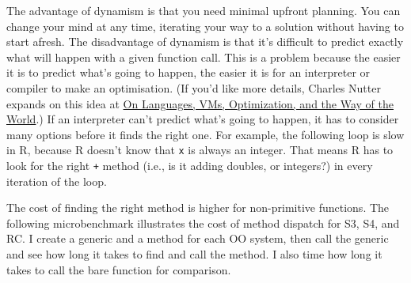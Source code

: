 The advantage of dynamism is that you need minimal upfront planning. You
can change your mind at any time, iterating your way to a solution
without having to start afresh. The disadvantage of dynamism is that
it's difficult to predict exactly what will happen with a given function
call. This is a problem because the easier it is to predict what's going
to happen, the easier it is for an interpreter or compiler to make an
optimisation. (If you'd like more details, Charles Nutter expands on
this idea at
\href{http://blog.headius.com/2013/05/on-languages-vms-optimization-and-way.html}{On
Languages, VMs, Optimization, and the Way of the World}.) If an
interpreter can't predict what's going to happen, it has to consider
many options before it finds the right one. For example, the following
loop is slow in R, because R doesn't know that \texttt{x} is always an
integer. That means R has to look for the right \texttt{+} method (i.e.,
is it adding doubles, or integers?) in every iteration of the loop.

\begin{Shaded}
\begin{Highlighting}[]
\StringTok{ }
\NormalTok{:}\NormalTok{) \{}
  \StringTok{ }\StringTok{ }
\NormalTok{\}}
\end{Highlighting}
\end{Shaded}

The cost of finding the right method is higher for non-primitive
functions. The following microbenchmark illustrates the cost of method
dispatch for S3, S4, and RC. I create a generic and a method for each OO
system, then call the generic and see how long it takes to find and call
the method. I also time how long it takes to call the bare function for
comparison. 

\begin{Shaded}
\begin{Highlighting}[]
\StringTok{ }

\StringTok{ }\NormalTok{(}\NormalTok{)}
\StringTok{ }

\StringTok{ }\NormalTok{(}\NormalTok{, }\NormalTok{(} \NormalTok{))}
\NormalTok{(}\NormalTok{(}\NormalTok{))}

\StringTok{ }\NormalTok{(}\NormalTok{, } \NormalTok{(} 

\StringTok{ }\NormalTok{()}
\StringTok{ }\NormalTok{()}
\end{Highlighting}
\end{Shaded}


